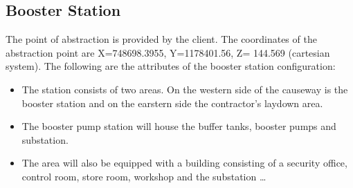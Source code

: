 \documentclass{article}%
\begin{document}
\subsection{Booster Station}%
\label{subsec:BoosterStation}%
The point of abstraction is provided by the client. The coordinates of the abstraction point are X=748698.3955, Y=1178401.56, Z= 144.569 (cartesian system).%
\newline%
%
\newline%
%
The following are the attributes of the booster station configuration:%
\begin{itemize}%
\item%
The station consists of two areas. On the western side of the causeway is the booster station and on the earstern side the contractor's laydown area.%
\item%
The booster pump station will house the buffer tanks, booster pumps and substation.%
\item%
The area will also be equipped with a building consisting of a security office, control room, store room, workshop and the substation%
\ldots%
\end{itemize}

%
\newpage

%
\end{document}
